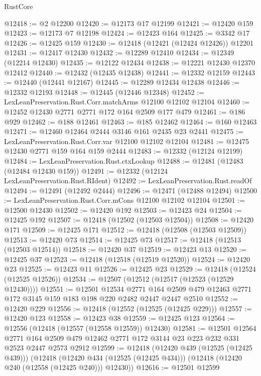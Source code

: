 \begin{lexlean}{RustCore}
\begin{coremodule}
@12418 := @2 @12200
@12420 := @12173 @17 @12199
@12421 := @12420 @159
@12423 := @12173 @7 @12198
@12424 := @12423 @164
@12425 := @3342 @17
@12426 := @12425 @159
@12430 := @12418 (@12421 (@12424 @12426)) @12201
@12431 := @12417 @12430
@12432 := @12289 @12410
@12434 := @12349 (@12214 @12430)
@12435 := @12122 @12434
@12438 := @12221 @12430 @12370 @12412
@12440 := @12432 (@12435 @12438)
@12441 := @12332 @12159
@12443 := @12440 (@12441 @12167)
@12445 := @12289 @12434 @12438
@12446 := @12332 @12193
@12448 := @12445 (@12446 @12348)
@12452 := LexLeanPreservation.Rust.Corr.matchArms @12100 @12102 @12104
@12460 := @12452 @12430 @2771 @2771 @172 @164 @2509 @177 @479
@12461 := @186 @929
@12462 := @188 @12461
@12463 := @185 @12462
@12464 := @160 @12463
@12471 := @12460 @12464 @2444 @3146 @161 @2435 @23 @2441
@12475 := LexLeanPreservation.Rust.Corr.var @12100 @12102 @12104
@12481 := @12475 @12430 @2771 @159 @164 @159 @2444
@12483 := @12332 (@12124 @12199)
@12484 := LexLeanPreservation.Rust.ctxLookup
@12488 := @12481 (@12483 (@12484 @12430 @159))
@12491 := @12332 (@12124 LexLeanPreservation.Rust.RIdent)
@12492 := LexLeanPreservation.Rust.readOf
@12494 := @12491 (@12492 @2444)
@12496 := @12471 (@12488 @12494)
@12500 := LexLeanPreservation.Rust.Corr.mCons @12100 @12102 @12104
@12501 := @12500 @12430
@12502 := @12420 @192
@12503 := @12423 @24
@12504 := @12425 @192
@12507 := @12418 (@12502 (@12503 @12504))
@12508 := @12420 @171
@12509 := @12425 @171
@12512 := @12418 (@12508 (@12503 @12509))
@12513 := @12420 @73
@12514 := @12425 @73
@12517 := @12418 (@12513 (@12503 @12514))
@12518 := @12420 @37
@12519 := @12423 @13
@12520 := @12425 @37
@12523 := @12418 (@12518 (@12519 @12520))
@12524 := @12420 @23
@12525 := @12423 @11
@12526 := @12425 @23
@12529 := @12418 (@12524 (@12525 @12526))
@12534 := @12507 (@12512 (@12517 (@12523 (@12529 @12430))))
@12551 := @12501
    @12534
    @2771
    @164
    @2509
    @479
    @12463
    @2771
    @172
    @3145
    @159
    @183
    @198
    @220
    @2482
    @2447
    @2447
    @2510
@12552 := @12420 @229
@12556 := @12418 (@12552 (@12525 (@12425 @229)))
@12557 := @12420 @123
@12558 := @12423 @38
@12559 := @12425 @123
@12564 := @12556 (@12418 (@12557 (@12558 @12559)) @12430)
@12581 := @12501
    @12564
    @2771
    @164
    @2509
    @479
    @12462
    @2771
    @172
    @3144
    @23
    @223
    @232
    @331
    @2523
    @2447
    @2573
    @2912
@12599 := @12418
    (@12420 @439 (@12525 (@12425 @439)))
    (@12418
      (@12420 @434 (@12525 (@12425 @434)))
      (@12418 (@12420 @240 (@12558 (@12425 @240))) @12430))
@12616 := @12501
    @12599

\end{coremodule}
\end{lexlean}
